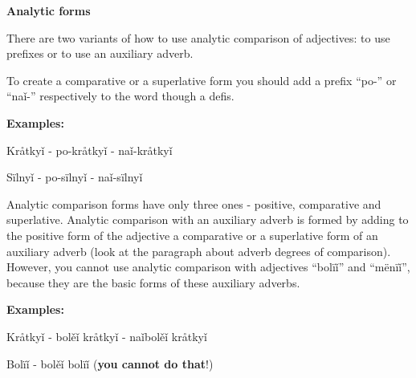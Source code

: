\textbf{Analytic forms}

There are two variants of how to use analytic comparison of adjectives: to use prefixes or to use an auxiliary adverb.

To create a comparative or a superlative form you should add a prefix “po-” or “naǐ-” respectively to the word though a defis.

\textbf{Examples:}

Kråtkyǐ - po-kråtkyǐ - naǐ-kråtkyǐ

Sïlnyǐ - po-sïlnyǐ - naǐ-sïlnyǐ

Analytic comparison forms have only three ones - positive, comparative and superlative. Analytic comparison with an auxiliary adverb is formed by adding to the positive form of the adjective a comparative or a superlative form of an auxiliary adverb (look at the paragraph about adverb degrees of comparison). However, you cannot use analytic comparison with adjectives “bolïǐ” and “mënïǐ”, because they are the basic forms of these auxiliary adverbs.

\textbf{Examples:}

Kråtkyǐ - bolěǐ kråtkyǐ - naǐbolěǐ kråtkyǐ

Bolïǐ - bolěǐ bolïǐ (\textbf{you cannot do that}!)
